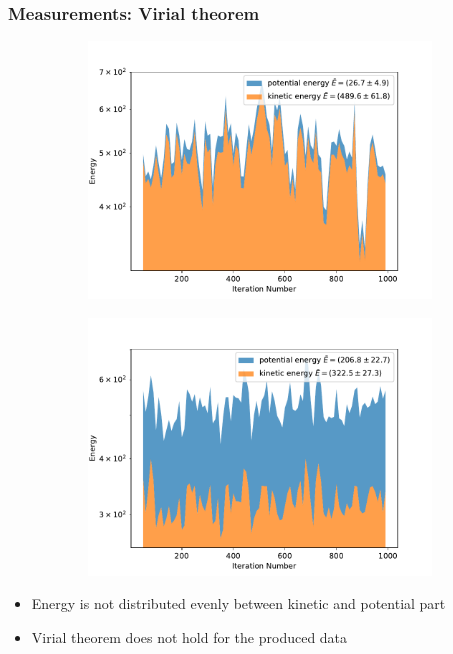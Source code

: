 \documentclass[aspectratio=169]{beamer}
\begin{document}
\begin{frame}
	\frametitle{Measurements: Virial theorem}
	\vspace{-10px}
	\begin{figure}[H]
		\centering
			\begin{subfigure}[c]{0.49\textwidth}
				\includegraphics[width=\textwidth]{../imgs/harmonic_oscillator_track/track_1000100_heavy_virial_log.pdf}
				\label{fig:track_1000100_heavy_virial_log}
			\end{subfigure}
			\begin{subfigure}[c]{0.49\textwidth}
				\includegraphics[width=\textwidth]{../imgs/harmonic_oscillator_track/track_1000100_virial_log.pdf}
				\label{fig:track_1000100_virial_log}
			\end{subfigure}
		\label{fig:track_1000100_virial}
	\end{figure}
	\begin{itemize}
		\item Energy is not distributed evenly between kinetic and potential part
		\item Virial theorem does not hold for the produced data
	\end{itemize}
\end{frame}
\end{document}
